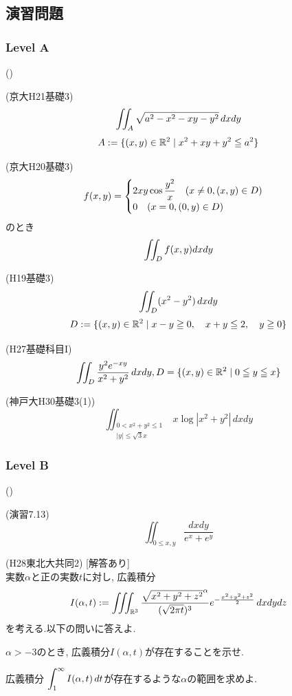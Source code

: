 \newpage






\clearpage
\subsection{演習問題}


\subsubsection{Level A}
\begin{prob} ()
\ben
\item (京大H21基礎3)
\[\displaystyle\iint_{A} \sqrt{a^2 - x^2 - xy - y^2}\, dxdy\]
\[A:= \{ (x,y)\in \mathbb{R}^2 \mid x^2 + xy + y^2 \leqq a^2 \}\]
\item (京大H20基礎3)
\[ f(x,y) = \begin{cases} 2xy\cos{\dfrac{y^2}{x}} \quad (x\neq 0, (x,y)\in D)\\ 0\quad  (x=0, (0,y)\in D) \end{cases}\]
のとき
\[\displaystyle\iint_{D} f(x,y)dxdy\]
\item (H19基礎3) \label{prob:H18B3}
\[\displaystyle\iint_{D} (x^2 - y^2) \, dxdy\]
\[D:= \{ (x,y)\in \mathbb{R}^2\mid x-y \geqq 0, \quad x+y\leqq 2,\quad y\geqq 0 \}\]
\item  (H27基礎科目I)
\[\iint_{D} \dfrac{y^2e^{-xy}}{x^2+y^2}\, dxdy, D=\{ (x,y)\in \mathbb{R}^2 \mid 0\leqq y\leqq x \}\]
\item (神戸大H30基礎3(1))
\[\iint_{\substack{0<x^2+y^2\leq 1\\ |y| \leq \sqrt{3}x}} x\log{|x^2+y^2|}\, dxdy\]
\een
\end{prob}







\subsubsection{Level B}
\begin{prob} ()
\ben
\item (\cite{rikou}演習7.13)
\[\iint_{0\leq x,y} \dfrac{dxdy}{e^{x}+e^{y}}\]
\item
\item
\item
\item
\een
\end{prob}

\begin{prob} (H28東北大共同2) [解答あり]\\
実数$\alpha$と正の実数$t$に対し, 広義積分
\[I(\alpha,t) := \displaystyle\iiint_{\mathbb{R}^{3}} \dfrac{\sqrt{x^2+y^2+z^2}^{\alpha}}{(\sqrt{2\pi t})^{3}}e^{-\frac{x^2+y^2+z^2}{2}}\, dxdydz\]
を考える.以下の問いに答えよ.
\ben
\item $\alpha > -3$のとき, 広義積分$I(\alpha,t)$が存在することを示せ.
\item 広義積分 $\displaystyle\int_{1}^{\infty} I(\alpha,t)\, dt$が存在するような$\alpha$の範囲を求めよ.
\een
\end{prob}

